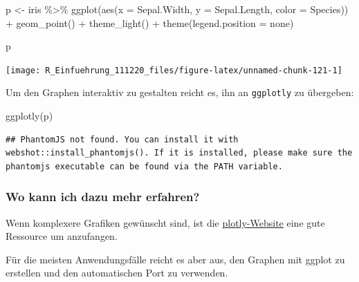 \documentclass[
]{book}
\newenvironment{Shaded}{\begin{snugshade}}{\end{snugshade}}
\newcommand{\AttributeTok}[1]{\textcolor[rgb]{0.77,0.63,0.00}{#1}}
\newcommand{\FunctionTok}[1]{\textcolor[rgb]{0.00,0.00,0.00}{#1}}
\newcommand{\NormalTok}[1]{#1}
\newcommand{\OtherTok}[1]{\textcolor[rgb]{0.56,0.35,0.01}{#1}}
\newcommand{\SpecialCharTok}[1]{\textcolor[rgb]{0.00,0.00,0.00}{#1}}
\newcommand{\StringTok}[1]{\textcolor[rgb]{0.31,0.60,0.02}{#1}}
\begin{document}
\begin{Shaded}
\begin{Highlighting}[]
\NormalTok{p }\OtherTok{\textless{}{-}}\NormalTok{ iris }\SpecialCharTok{\%\textgreater{}\%} 
  \FunctionTok{ggplot}\NormalTok{(}\FunctionTok{aes}\NormalTok{(}\AttributeTok{x =}\NormalTok{ Sepal.Width,}
             \AttributeTok{y =}\NormalTok{ Sepal.Length,}
             \AttributeTok{color =}\NormalTok{ Species)) }\SpecialCharTok{+}
  \FunctionTok{geom\_point}\NormalTok{() }\SpecialCharTok{+}
  \FunctionTok{theme\_light}\NormalTok{() }\SpecialCharTok{+}
  \FunctionTok{theme}\NormalTok{(}\AttributeTok{legend.position =} \StringTok{\textquotesingle{}none\textquotesingle{}}\NormalTok{)}

\NormalTok{p}
\end{Highlighting}
\end{Shaded}

\begin{center}\texttt{[image: R\_Einfuehrung\_111220\_files/figure-latex/unnamed-chunk-121-1]} \end{center}

Um den Graphen interaktiv zu gestalten reicht es, ihn an \texttt{ggplotly} zu übergeben:

\begin{Shaded}
\begin{Highlighting}[]
\FunctionTok{ggplotly}\NormalTok{(p)}
\end{Highlighting}
\end{Shaded}

\begin{verbatim}
## PhantomJS not found. You can install it with webshot::install_phantomjs(). If it is installed, please make sure the phantomjs executable can be found via the PATH variable.
\end{verbatim}

\hypertarget{htmlwidget-e4ceb87f7068dc58768f}{}

\hypertarget{wo-kann-ich-dazu-mehr-erfahren-3}{%
\subsubsection{Wo kann ich dazu mehr erfahren?}\label{wo-kann-ich-dazu-mehr-erfahren-3}}

Wenn komplexere Grafiken gewünscht sind, ist die \href{https://plotly.com/r/}{plotly-Website} eine gute Ressource um anzufangen.

Für die meisten Anwendungsfälle reicht es aber aus, den Graphen mit ggplot zu erstellen und den automatischen Port zu verwenden.
\end{document}
